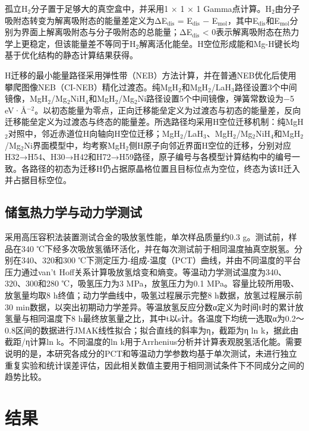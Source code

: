 \documentclass[preprint,12pt]{elsarticle}
\begin{document}
孤立H$_{\mathrm{2}}$分子置于足够大的真空盒中，并采用1 × 1 × 1 Gamma点计算。H$_{\mathrm{2}}$由分子吸附态转变为解离吸附态的能量差定义为ΔE$_{\mathrm{dis}}$ = E$_{\mathrm{dis}}$ − E$_{\mathrm{mol}}$，其中E$_{\mathrm{dis}}$和E$_{\mathrm{mol}}$分别为界面上解离吸附态与分子吸附态的总能量；ΔE$_{\mathrm{dis}}$ < 0表示解离吸附态在热力学上更稳定，但该能量差不等同于H$_{\mathrm{2}}$解离活化能垒。H空位形成能和Mg-H键长均基于优化结构的静态计算结果获得。

H迁移的最小能量路径采用弹性带（NEB）方法计算，并在普通NEB优化后使用攀爬图像NEB（CI-NEB）精化过渡态\cite{ref23}。纯MgH$_{\mathrm{2}}$和MgH$_{\mathrm{2}}$/LaH$_{\mathrm{3}}$路径设置3个中间镜像，MgH$_{\mathrm{2}}$/Mg$_{\mathrm{2}}$NiH$_{\mathrm{4}}$和MgH$_{\mathrm{2}}$/Mg$_{\mathrm{2}}$Ni路径设置5个中间镜像，弹簧常数设为−5 eV·Å$^{-2}$。以初态能量为零点，正向迁移能垒定义为过渡态与初态的能量差，反向迁移能垒定义为过渡态与终态的能量差。所选路径均采用H空位迁移机制：纯MgH$_{\mathrm{2}}$对照中，邻近赤道位H向轴向H空位迁移；MgH$_{\mathrm{2}}$/LaH$_{\mathrm{3}}$、MgH$_{\mathrm{2}}$/Mg$_{\mathrm{2}}$NiH$_{\mathrm{4}}$和MgH$_{\mathrm{2}}$/Mg$_{\mathrm{2}}$Ni界面模型中，均考察MgH$_{\mathrm{2}}$侧H原子向邻近界面H空位的迁移，分别对应H32→H54、H30→H42和H72→H59路径，原子编号与各模型计算结构中的编号一致。各路径的初态为迁移H仍占据原晶格位置且目标位点为空位，终态为该H迁入并占据目标空位。

\subsection{储氢热力学与动力学测试}

采用高压容积法装置测试合金的吸放氢性能，单次样品质量约0.3 g。测试前，样品在340 ℃下经多次吸放氢循环活化，并在每次测试前于相同温度抽真空脱氢。分别在340、320和300 ℃下测定压力-组成-温度（PCT）曲线，并由不同温度的平台压力通过van’t Hoff关系\cite{ref24}计算吸放氢焓变和熵变。等温动力学测试温度为340、320、300和280 ℃，吸氢压力为3 MPa，放氢压力为0.1 MPa。容量比较所用吸、放氢量均取8 h终值；动力学曲线中，吸氢过程展示完整8 h数据，放氢过程展示前30 min数据，以突出初期动力学差异。等温放氢反应分数α定义为时间t时的累计放氢量与相同温度下8 h最终放氢量之比，其中t以s计。各温度下均统一选取α为0.2～0.8区间的数据进行JMAK线性拟合；拟合直线的斜率为η，截距为η ln k，据此由截距/η计算ln k。不同温度的ln k用于Arrhenius分析并计算表观脱氢活化能。需要说明的是，本研究各成分的PCT和等温动力学参数均基于单次测试，未进行独立重复实验和统计误差评估，因此相关数值主要用于相同测试条件下不同成分之间的趋势比较。

\section{结果}
\end{document}
